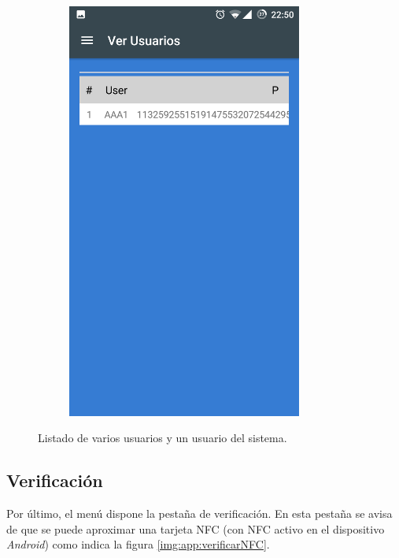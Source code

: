 \documentclass[../PFC.tex]{subfiles}
\begin{document}
\begin{figure}[H]
\begin{subfigure}{0.4\textwidth}
       \centering
       \includegraphics[width=0.85\textwidth]{./img/app/nuevoUsuarioInsertado}
    \end{subfigure}   
  \caption{Listado de varios usuarios y un usuario del sistema.}
  \label{img:app:verUsuarios}
\end{figure}

\subsection{Verificación}
\label{App:Verificacion}

Por último, el menú dispone la pestaña de verificación. En esta pestaña se avisa de que se puede aproximar una tarjeta NFC (con NFC activo en el dispositivo \textit{Android}) como indica la figura \ref{img:app:verificarNFC}.
\end{document}
